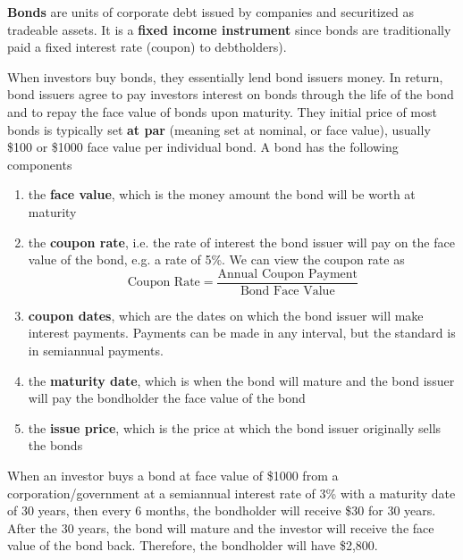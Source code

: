 \documentclass{article}
\begin{document}
  \begin{definition}[Bond]
    \textbf{Bonds} are units of corporate debt issued by companies and securitized as tradeable assets. It is a \textbf{fixed income instrument} since bonds are traditionally paid a fixed interest rate (coupon) to debtholders). 

    When investors buy bonds, they essentially lend bond issuers money. In return, bond issuers agree to pay investors interest on bonds through the life of the bond and to repay the face value of bonds upon maturity. They initial price of most bonds is typically set \textbf{at par} (meaning set at nominal, or face value), usually \$100 or \$1000 face value per individual bond. A bond has the following components
    \begin{enumerate}
      \item the \textbf{face value}, which is the money amount the bond will be worth at maturity
      \item the \textbf{coupon rate}, i.e. the rate of interest the bond issuer will pay on the face value of the bond, e.g. a rate of 5\%. We can view the coupon rate as 
      \[\text{Coupon Rate} = \frac{\text{Annual Coupon Payment}}{\text{Bond Face Value}}\]
      \item \textbf{coupon dates}, which are the dates on which the bond issuer will make interest payments. Payments can be made in any interval, but the standard is in semiannual payments. 
      \item the \textbf{maturity date}, which is when the bond will mature and the bond issuer will pay the bondholder the face value of the bond 
      \item the \textbf{issue price}, which is the price at which the bond issuer originally sells the bonds
    \end{enumerate}
    When an investor buys a bond at face value of \$1000 from a corporation/government at a semiannual interest rate of 3\% with a maturity date of 30 years, then every 6 months, the bondholder will receive \$30 for 30 years. After the 30 years, the bond will mature and the investor will receive the face value of the bond back. Therefore, the bondholder will have \$2,800. 
  \end{definition}
\end{document}
